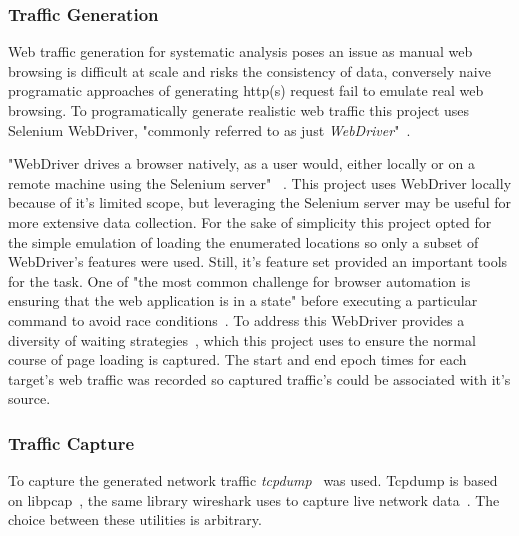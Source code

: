 \documentclass[10pt,sigconf,letterpaper,nonacm]{acmart}
\begin{document}
\subsubsection{Traffic Generation} Web traffic generation for
systematic analysis poses an issue as manual web browsing is difficult at scale and risks
the consistency of data,
conversely naive programatic approaches of generating http(s) request fail to emulate
real web browsing. To programatically generate realistic web traffic this project uses
Selenium WebDriver, "commonly referred to as just \textit{WebDriver}"~\cite{Selenium2024}.
\par"WebDriver drives a browser natively, as a user would, either locally or on a remote
machine using the Selenium server" ~\cite{Selenium2024}. This project uses WebDriver
locally because of it's limited scope, but leveraging the Selenium server may be useful
for more extensive data collection. For the sake of simplicity this project opted for the
simple emulation of loading the enumerated locations so only a subset of WebDriver's
features were used. Still, it's feature set provided an important tools for the task. One
of "the most common challenge for browser automation is ensuring that the web application
is in a state" before executing a particular command to avoid race
conditions~\cite{Selenium2024}. To address this WebDriver provides a diversity of waiting
strategies~\cite{Selenium2024}, which this project uses to ensure the normal course of
page loading is captured. The start and end epoch times for each target's web traffic was
recorded so captured traffic's could be associated with it's source.
\subsubsection{Traffic Capture} To capture the generated network traffic
\textit{tcpdump}~\cite{Tcpdump} was used. Tcpdump is based on
libpcap~\cite{Tcpdump}, the same library wireshark uses to capture live network
data~\cite{WiresharkLibpcap}. The choice between these utilities is arbitrary.
\end{document}
